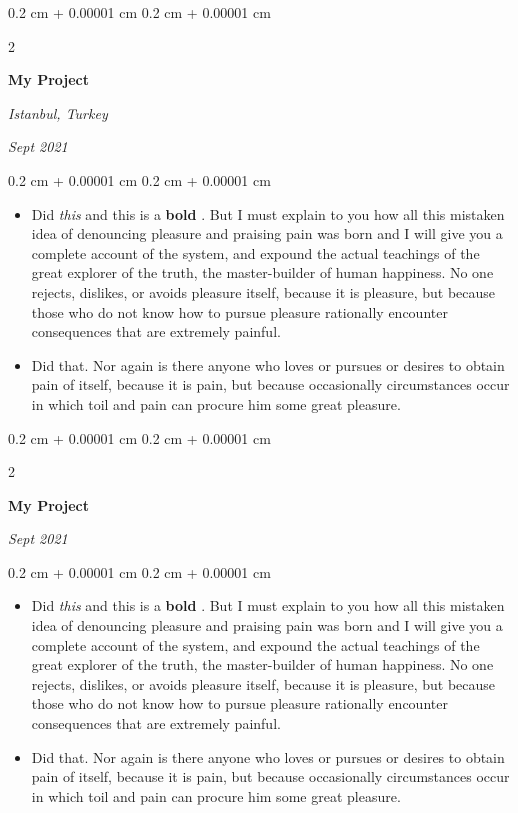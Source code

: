 \documentclass[10pt, letterpaper]{article}
\newenvironment{highlights}{
    \begin{itemize}[
        topsep=0.10 cm,
        parsep=0.10 cm,
        partopsep=0pt,
        itemsep=0pt,
        leftmargin=0.4 cm + 10pt
    ]
}{
    \end{itemize}
} %
\newenvironment{onecolentry}{
    \begin{adjustwidth}{
        0.2 cm + 0.00001 cm
    }{
        0.2 cm + 0.00001 cm
    }
}{
    \end{adjustwidth}
} %
\newenvironment{twocolentry}[2][]{
    \onecolentry
    \def\secondColumn{#2}
    \setcolumnwidth{\fill, 4.5 cm}
    \begin{paracol}{2}
}{
    \switchcolumn \raggedleft \secondColumn
    \end{paracol}
    \endonecolentry
} %
\let\hrefWithoutArrow\href
\renewcommand{\href}[2]{\hrefWithoutArrow{#1}{\ifthenelse{\equal{#2}{}}{ }{#2 }\raisebox{.15ex}{\footnotesize \faExternalLink*}}}
\begin{document}
        \vspace{0.2 cm}

        \begin{twocolentry}{
        \textit{Istanbul, Turkey}    
            
        \textit{Sept 2021}}
            \textbf{My Project}
        \end{twocolentry}

        \vspace{0.10 cm}
        \begin{onecolentry}
            \begin{highlights}
                \item Did \textit{this} and this is a \textbf{bold} \href{https://example.com}{link}. But I must explain to you how all this mistaken idea of denouncing pleasure and praising pain was born and I will give you a complete account of the system, and expound the actual teachings of the great explorer of the truth, the master-builder of human happiness. No one rejects, dislikes, or avoids pleasure itself, because it is pleasure, but because those who do not know how to pursue pleasure rationally encounter consequences that are extremely painful.
                \item Did that. Nor again is there anyone who loves or pursues or desires to obtain pain of itself, because it is pain, but because occasionally circumstances occur in which toil and pain can procure him some great pleasure.
            \end{highlights}
        \end{onecolentry}


        \vspace{0.2 cm}

        \begin{twocolentry}{
            
            
        \textit{Sept 2021}}
            \textbf{My Project}
        \end{twocolentry}

        \vspace{0.10 cm}
        \begin{onecolentry}
            \begin{highlights}
                \item Did \textit{this} and this is a \textbf{bold} \href{https://example.com}{link}. But I must explain to you how all this mistaken idea of denouncing pleasure and praising pain was born and I will give you a complete account of the system, and expound the actual teachings of the great explorer of the truth, the master-builder of human happiness. No one rejects, dislikes, or avoids pleasure itself, because it is pleasure, but because those who do not know how to pursue pleasure rationally encounter consequences that are extremely painful.
                \item Did that. Nor again is there anyone who loves or pursues or desires to obtain pain of itself, because it is pain, but because occasionally circumstances occur in which toil and pain can procure him some great pleasure.
            \end{highlights}
        \end{onecolentry}
\end{document}
